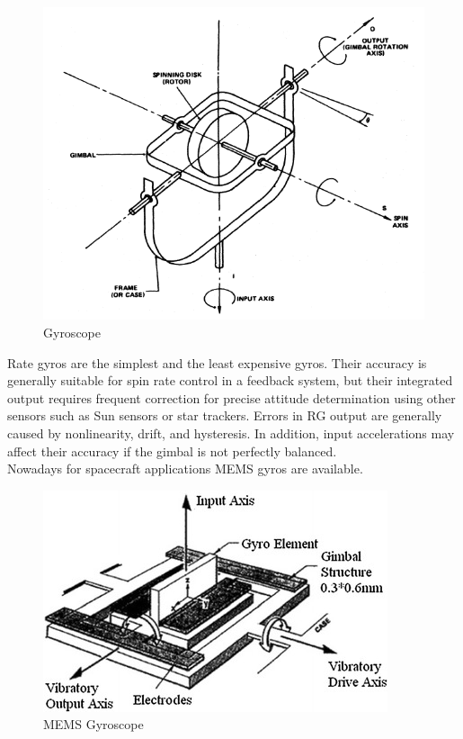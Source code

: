 \documentclass[11pt,a4paper]{report}
\begin{document}
\begin{figure}[H]
 	\centering
 	\includegraphics[scale=0.4]{gfx/gyroscope.png}
    \caption{Gyroscope}
    \label{fig:gyro}
\end{figure}

Rate gyros are the simplest and the least expensive gyros. Their accuracy is
generally suitable for spin rate control in a feedback system, but their integrated output requires frequent correction for precise attitude determination using other sensors such as Sun sensors or star trackers.
Errors in RG output are generally caused by nonlinearity, drift, and hysteresis. In addition, input accelerations may affect their accuracy if the gimbal is not perfectly balanced.\\
Nowadays for spacecraft applications MEMS gyros are available.\\

\begin{figure}[H]
 	\centering
 	\includegraphics[scale=0.3]{gfx/mems_gyro.jpg}
    \caption{MEMS Gyroscope}
\end{figure}
\end{document}
